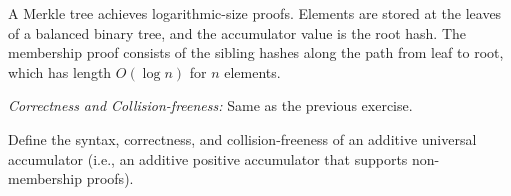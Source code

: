 \ifsolutions
\begin{mysolution}
  A Merkle tree achieves logarithmic-size proofs.
  Elements are stored at the leaves of a balanced binary tree, and the accumulator value is the root hash.
  The membership proof consists of the sibling hashes along the path from leaf to root, which has length $O(\log n)$ for $n$ elements.

  \emph{Correctness and Collision-freeness:} Same as the previous exercise.
\end{mysolution}
\fi

\begin{exercise}
  Define the syntax, correctness, and collision-freeness of an additive universal accumulator (i.e., an additive positive accumulator that supports non-membership proofs).
\end{exercise}

